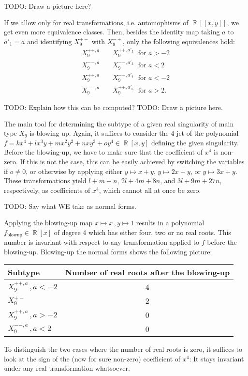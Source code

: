 \documentclass[noend]{amsproc}
\DeclareMathOperator{\requiv}{\overset{r}{\sim}}
\DeclareMathOperator{\R}{\mathbb{R}}
\begin{document}
TODO: Draw a picture here?

If we allow only for real transformations, i.e. automophisms of $\R[[x,y]]$,
we get even more equivalence classes. Then, besides the identity map taking $a$
to $a'_1=a$ and identifying $X_9^{+-}$ with $X_9^{-+}$,
only the following equivalences hold:
\begin{align}
X_9^{++,a} \; &\requiv \; X_9^{++,a'_5} \; \text{ for } a > -2 \\
X_9^{--,a} \; &\requiv \; X_9^{--,a'_3} \; \text{ for } a < 2 \\
X_9^{++,a} \; &\requiv \; X_9^{--,a'_4} \; \text{ for } a < -2 \\
X_9^{--,a} \; &\requiv \; X_9^{++,a'_6} \; \text{ for } a > 2.
\end{align}

TODO: Explain how this can be computed?
TODO: Draw a picture here.

The main tool for determining the subtype of a given real singularity of main
type $X_9$ is blowing-up. Again, it suffices to consider the 4-jet of the
polynomial $f = kx^4 + lx^3y + mx^2y^2 + nxy^3 + oy^4 \in \R[x, y]$ defining
the given singularity. Before the blowing-up, we have to make sure that the
coefficient of $x^4$ is non-zero. If this is not
the case, this can be easily achieved by switching the variables if
$o \neq 0$, or otherwise by applying either $y \mapsto x+y$, $y \mapsto 2x+y$,
or $y \mapsto 3x+y$. These transformations yield $l+m+n$, $2l+4m+8n$, and
$3l+9m+27n$, respectively, as coefficients of $x^4$, which cannot all at once
be zero.

TODO: Say what WE take as normal forms.

Applying the blowing-up map $x \mapsto x \,, y \mapsto 1$ results in a
polynomial $f_{\text{blowup}} \in \R[x]$ of degree 4 which has either four, two
or no real roots. This number is invariant with respect to any transformation
applied to $f$ before the blowing-up. Blowing-up the normal forms shows the
following picture:

\begin{tabular}{l|c}
Subtype & Number of real roots after the blowing-up \\ \hline
$X_9^{++,a} \,, a < -2$ & 4 \\
$X_9^{+-}$ & 2 \\
$X_9^{++,a} \,, a > -2$ & 0 \\
$X_9^{--,a} \,, a < 2$ & 0
\end{tabular}

To distinguish the two cases where the number of real roots is zero, it
suffices to look at the sign of the (now for sure non-zero) coefficient of
$x^4$: It stays invariant under any real transformation whatsoever.
\end{document}
